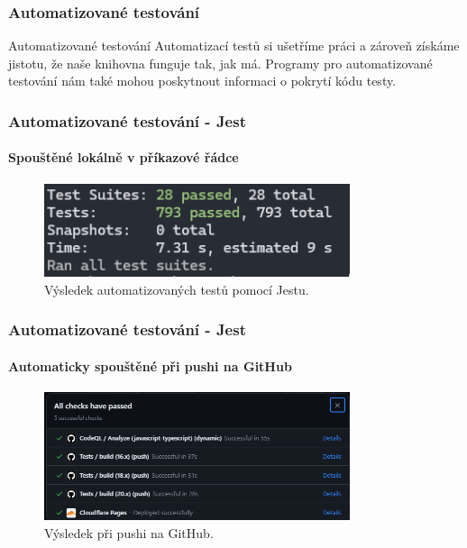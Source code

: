 \begin{frame}
    \frametitle{Automatizované testování}

    \begin{block}{Automatizované testování}
        Automatizací testů si ušetříme práci a zároveň získáme jistotu, že naše knihovna funguje tak, jak má.
        Programy pro automatizované testování nám také mohou poskytnout informaci o pokrytí kódu testy.
    \end{block}

\end{frame}

\begin{frame}
    \frametitle{Automatizované testování - Jest}
    \framesubtitle{Spouštěné lokálně v příkazové řádce}
    \begin{figure}
        \centering
        \includegraphics[width=0.8\textwidth]{../resources/tests.png}
        \caption{Výsledek automatizovaných testů pomocí Jestu.}
    \end{figure}
\end{frame}

\begin{frame}
    \frametitle{Automatizované testování - Jest}
    \framesubtitle{Automaticky spouštěné při pushi na GitHub}
    \begin{figure}
        \centering
        \includegraphics[width=0.8\textwidth]{../resources/tests-github.png}
        \caption{Výsledek  při pushi na GitHub.}
    \end{figure}

\end{frame}

